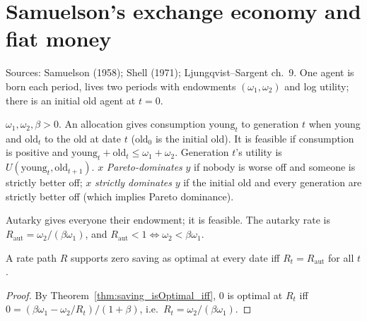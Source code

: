 \section{Samuelson's exchange economy and fiat money}
\label{sec:samuelson}

Sources: Samuelson (1958); Shell (1971); Ljungqvist--Sargent ch.~9. One agent is born each period, lives two
periods with endowments $(\omega_1, \omega_2)$ and log utility; there is an initial old agent at $t = 0$.

\begin{definition}
\label{def:samuelson}
\leanok
{}
$\omega_1, \omega_2, \beta > 0$. An allocation gives consumption $\mathrm{young}_t$ to generation $t$ when young
and $\mathrm{old}_t$ to the old at date $t$ ($\mathrm{old}_0$ is the initial old). It is feasible if consumption is
positive and $\mathrm{young}_t + \mathrm{old}_t \le \omega_1 + \omega_2$. Generation $t$'s utility is
$U(\mathrm{young}_t, \mathrm{old}_{t+1})$. $x$ \emph{Pareto-dominates} $y$ if nobody is worse off and someone is
strictly better off; $x$ \emph{strictly dominates} $y$ if the initial old and every generation are strictly
better off (which implies Pareto dominance).
\end{definition}

\begin{definition}[Autarky]
\label{def:autarky}
\leanok
{}
Autarky gives everyone their endowment; it is feasible. The autarky rate is $R_{\mathrm{aut}} = \omega_2/(\beta\omega_1)$,
and $R_{\mathrm{aut}} < 1 \iff \omega_2 < \beta\omega_1$.
\end{definition}

\begin{theorem}
\label{thm:samuelson_isEquilibrium_iff}
\leanok
{}
A rate path $R$ supports zero saving as optimal at every date iff $R_t = R_{\mathrm{aut}}$ for all $t$.
\end{theorem}
\begin{proof}
\leanok
By Theorem~\ref{thm:saving_isOptimal_iff}, $0$ is optimal at $R_t$ iff $0 = (\beta\omega_1 - \omega_2/R_t)/(1+\beta)$,
i.e.\ $R_t = \omega_2/(\beta\omega_1)$.
\end{proof}

